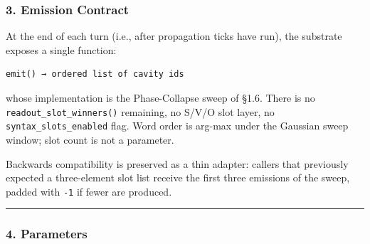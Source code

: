 \documentclass[
  11pt,
  a4paper,
]{article}
\begin{document}
\subsubsection{3. Emission Contract}\label{emission-contract}

At the end of each turn (i.e., after propagation ticks have run), the
substrate exposes a single function:

\begin{verbatim}
emit() → ordered list of cavity ids
\end{verbatim}

whose implementation is the Phase-Collapse sweep of §1.6. There is no
\texttt{readout\_slot\_winners()} remaining, no S/V/O slot layer, no
\texttt{syntax\_slots\_enabled} flag. Word order is arg-max under the
Gaussian sweep window; slot count is not a parameter.

Backwards compatibility is preserved as a thin adapter: callers that
previously expected a three-element slot list receive the first three
emissions of the sweep, padded with \texttt{-1} if fewer are produced.

\begin{center}\rule{0.5\linewidth}{0.5pt}\end{center}

\subsubsection{4. Parameters}\label{parameters}
\end{document}
